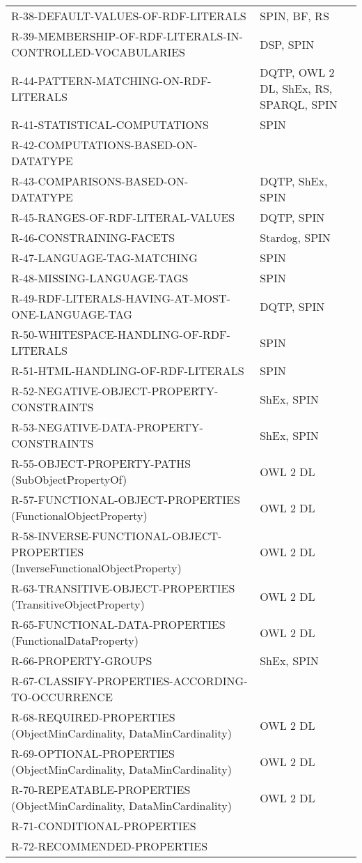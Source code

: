 \documentclass{llncs}
\begin{document}
\begin{table}
\begin{tabular}{ll}
R-38-DEFAULT-VALUES-OF-RDF-LITERALS & SPIN, BF, RS \\
R-39-MEMBERSHIP-OF-RDF-LITERALS-IN-CONTROLLED-VOCABULARIES & DSP, SPIN \\
R-44-PATTERN-MATCHING-ON-RDF-LITERALS & DQTP, OWL 2 DL, ShEx, RS, SPARQL, SPIN \\
R-41-STATISTICAL-COMPUTATIONS & SPIN \\
R-42-COMPUTATIONS-BASED-ON-DATATYPE & \\
R-43-COMPARISONS-BASED-ON-DATATYPE & DQTP, ShEx, SPIN \\
R-45-RANGES-OF-RDF-LITERAL-VALUES & DQTP, SPIN \\
R-46-CONSTRAINING-FACETS & Stardog, SPIN \\
R-47-LANGUAGE-TAG-MATCHING & SPIN \\
R-48-MISSING-LANGUAGE-TAGS & SPIN \\
R-49-RDF-LITERALS-HAVING-AT-MOST-ONE-LANGUAGE-TAG & DQTP, SPIN \\
R-50-WHITESPACE-HANDLING-OF-RDF-LITERALS & SPIN \\
R-51-HTML-HANDLING-OF-RDF-LITERALS & SPIN \\
R-52-NEGATIVE-OBJECT-PROPERTY-CONSTRAINTS & ShEx, SPIN \\
R-53-NEGATIVE-DATA-PROPERTY-CONSTRAINTS & ShEx, SPIN \\
R-55-OBJECT-PROPERTY-PATHS (SubObjectPropertyOf) & OWL 2 DL \\
R-57-FUNCTIONAL-OBJECT-PROPERTIES (FunctionalObjectProperty) & OWL 2 DL \\
R-58-INVERSE-FUNCTIONAL-OBJECT-PROPERTIES (InverseFunctionalObjectProperty) & OWL 2 DL \\
R-63-TRANSITIVE-OBJECT-PROPERTIES (TransitiveObjectProperty) & OWL 2 DL \\
R-65-FUNCTIONAL-DATA-PROPERTIES (FunctionalDataProperty) & OWL 2 DL \\
R-66-PROPERTY-GROUPS & ShEx, SPIN \\
R-67-CLASSIFY-PROPERTIES-ACCORDING-TO-OCCURRENCE & \\
R-68-REQUIRED-PROPERTIES (ObjectMinCardinality, DataMinCardinality) & OWL 2 DL \\
R-69-OPTIONAL-PROPERTIES  (ObjectMinCardinality, DataMinCardinality) & OWL 2 DL \\
R-70-REPEATABLE-PROPERTIES (ObjectMinCardinality, DataMinCardinality) & OWL 2 DL \\
R-71-CONDITIONAL-PROPERTIES \\
R-72-RECOMMENDED-PROPERTIES \\

\end{tabular}
\end{table}
\end{document}
